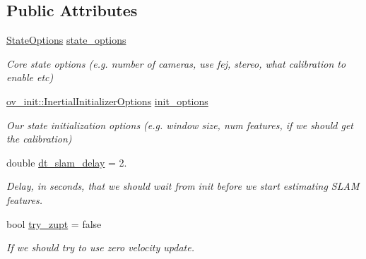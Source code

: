 \subsection*{Public Attributes}
\begin{DoxyCompactItemize}
\item 
\mbox{\label{structov__msckf_1_1VioManagerOptions_a578756373f9bcd2eadae31c419fb8c43}} 
\hyperlink{structov__msckf_1_1StateOptions}{State\+Options} \hyperlink{structov__msckf_1_1VioManagerOptions_a578756373f9bcd2eadae31c419fb8c43}{state\+\_\+options}
\begin{DoxyCompactList}\small\item\em Core state options (e.\+g. number of cameras, use fej, stereo, what calibration to enable etc) \end{DoxyCompactList}\item 
\mbox{\label{structov__msckf_1_1VioManagerOptions_aeab967a61ff3c317e7d1d30ab61c70cc}} 
\hyperlink{structov__init_1_1InertialInitializerOptions}{ov\+\_\+init\+::\+Inertial\+Initializer\+Options} \hyperlink{structov__msckf_1_1VioManagerOptions_aeab967a61ff3c317e7d1d30ab61c70cc}{init\+\_\+options}
\begin{DoxyCompactList}\small\item\em Our state initialization options (e.\+g. window size, num features, if we should get the calibration) \end{DoxyCompactList}\item 
\mbox{\label{structov__msckf_1_1VioManagerOptions_ae921221a9db709f06fbd7379e3430bf8}} 
double \hyperlink{structov__msckf_1_1VioManagerOptions_ae921221a9db709f06fbd7379e3430bf8}{dt\+\_\+slam\+\_\+delay} = 2.
\begin{DoxyCompactList}\small\item\em Delay, in seconds, that we should wait from init before we start estimating S\+L\+AM features. \end{DoxyCompactList}\item 
\mbox{\label{structov__msckf_1_1VioManagerOptions_a92fe206a83fc4b6c79b88a19c7ff7f3a}} 
bool \hyperlink{structov__msckf_1_1VioManagerOptions_a92fe206a83fc4b6c79b88a19c7ff7f3a}{try\+\_\+zupt} = false
\begin{DoxyCompactList}\small\item\em If we should try to use zero velocity update. \end{DoxyCompactList}\item 

\end{DoxyCompactItemize}
